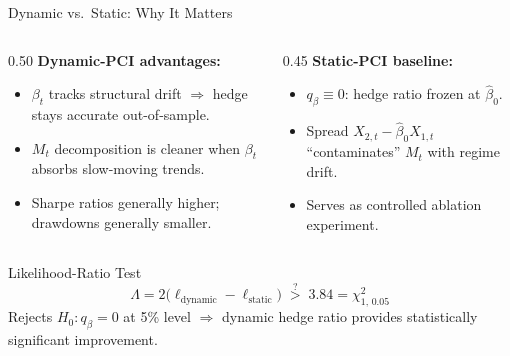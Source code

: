 \documentclass[10pt, aspectratio=169]{beamer}
\begin{document}
\begin{frame}{Dynamic vs.\ Static: Why It Matters}
  \begin{columns}[T]
    \begin{column}{0.50\textwidth}
      \textbf{Dynamic-PCI advantages:}
      \begin{itemize}
        \item $\beta_t$ tracks structural drift $\Rightarrow$ hedge stays
              accurate out-of-sample.
        \item $M_t$ decomposition is cleaner when $\beta_t$ absorbs
              slow-moving trends.
        \item Sharpe ratios generally higher; drawdowns generally smaller.
      \end{itemize}
    \end{column}
    \begin{column}{0.45\textwidth}
      \textbf{Static-PCI baseline:}
      \begin{itemize}
        \item $q_\beta \equiv 0$: hedge ratio frozen at $\hat{\beta}_0$.
        \item Spread $X_{2,t} - \hat{\beta}_0 X_{1,t}$ ``contaminates''
              $M_t$ with regime drift.
        \item Serves as controlled ablation experiment.
      \end{itemize}
    \end{column}
  \end{columns}
  \vspace{8pt}
  \begin{block}{Likelihood-Ratio Test}
    \[
      \Lambda = 2\bigl(\ell_{\text{dynamic}} - \ell_{\text{static}}\bigr)
      \;\overset{?}{>}\; 3.84 = \chi^2_{1,\,0.05}
    \]
    Rejects $H_0: q_\beta = 0$ at 5\% level $\Rightarrow$ dynamic hedge ratio
    provides statistically significant improvement.
  \end{block}
\end{frame}
\end{document}
